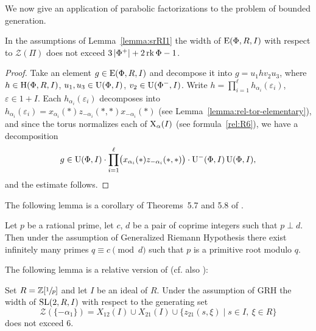 We now give an application of parabolic factorizations to the problem of bounded generation.
 
\begin{lemma}\label{lemma:srRI1_width} In the assumptions of Lemma~\ref{lemma:srRI1} the width of $\operatorname{E}(\Phi,R,I)$ with respect to $\mathcal{Z}(\Pi)$ does not exceed $3\left|\Phi^+\right|+2\operatorname{rk}\Phi-1$. \end{lemma}
\begin{proof}
Take an element $g\in\operatorname{E}(\Phi,R,I)$ and decompose it into $g=u_1 h v_2 u_3$, where $h\in\operatorname{H}(\Phi,R,I)$, $u_1,u_3\in\operatorname{U}(\Phi,I)$, $v_2\in\operatorname{U}(\Phi^-,I)$. 
Write $h=\prod_{i=1}^\ell h_{\alpha_i}(\varepsilon_i)$, $\varepsilon\in1+I$. 
Each $h_{\alpha_i}(\varepsilon_i)$ decomposes into $h_{\alpha_i}(\varepsilon_i) = x_{\alpha_i}(*) z_{-\alpha_i}(*,*) x_{-\alpha_i}(*)$ 
 (see Lemma~\ref{lemma:rel-tor-elementary}), and since the torus normalizes each of $\operatorname{X}_\alpha(I)$ (see formula~\ref{rel:R6}), we have a decomposition
\[ g\in\operatorname{U}(\Phi,I)\cdot\prod_{i=1}^\ell\bigl(x_{\alpha_i}(*)z_{-\alpha_i}(*,*)\bigr)\cdot \operatorname{U}^-(\Phi,I) \operatorname{U}(\Phi,I), \]
and the estimate follows. \end{proof}

The following lemma is a corollary of Theorems~5.7 and 5.8 of \cite{LenMorStePrimitiveRoot}.
\begin{lemma}
Let $p$ be a rational prime, let $c$, $d$ be a pair of coprime integers such that $p \perp d$.
Then under the assumption of Generalized Riemann Hypothesis there exist infinitely many primes $q\equiv c\pmod{d}$ such that $p$ is a primitive root modulo $q$.
\end{lemma}

The following lemma is a relative version of \cite[Lemma~6]{VavSmSuUnitrEng} (cf. also \cite{VseUnitrZ1p}):

\begin{lemma}\label{lemma:Z1p}
Set $R=\mathbb{Z}[\sfrac{1}{p}]$ and let $I$ be an ideal of $R$.
Under the assumption of GRH the width of $\operatorname{SL}(2,R,I)$ with respect to the generating set $$\mathcal{Z}(\{-\alpha_1\})=X_{12}(I)\cup X_{21}(I) \cup \{z_{21}(s, \xi) \mid s\in I,\ \xi\in R\}$$ does not exceed $6$.
\end{lemma}


